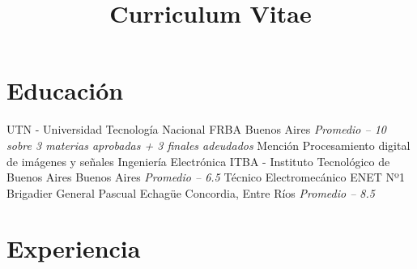 \documentclass[11pt,a4paper,sans]{moderncv} 	%
\title 			{Curriculum Vitae}
\begin{document}
\makecvtitle %
\section{Educación}
 	{UTN - Universidad Tecnología Nacional FRBA}	{Buenos Aires} 		{\textit{Promedio -- 10 sobre 3 materias aprobadas + 3 finales adeudados}} 	{Mención Procesamiento digital de imágenes y señales} 
 	{Ingeniería Electrónica} 	{ITBA - Instituto Tecnológico de Buenos Aires}	{Buenos Aires} 		{\textit{Promedio -- 6.5}} 							{}
 	{Técnico Electromecánico} 	{ENET Nº1 Brigadier General Pascual Echagüe}	{Concordia, Entre Ríos} {\textit{Promedio -- 8.5}} 							{}
\section{Experiencia}
\end{document}
